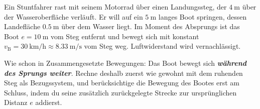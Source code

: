 \documentclass[addpoints,11pt,a4paper]{exam}
\newlength{\antwortraumlen}
\newcommand{\Antwortraum}[1]{%
  \pgfmathsetlength{\antwortraumlen}{#1*2.5cm}%
  \begin{answerbox}
    \rule{0pt}{\antwortraumlen}%
  \end{answerbox}%
}
\begin{document}
\begin{questions}
\begin{taskbox}
\question[10] Ein Stuntfahrer rast mit seinem Motorrad über einen
Landungssteg, der $\SI{4}{\meter}$ über der Wasseroberfläche verläuft. Er
will auf ein $\SI{5}{\meter}$ langes Boot springen, dessen Landefläche
$\SI{0.5}{\meter}$ über dem Wasser liegt. Im Moment des Absprungs ist das
Boot $e=\SI{10}{\meter}$ vom Steg entfernt und bewegt sich mit konstant
$v_{\text{B}}=\SI{30}{\kilo\meter\per\hour}\approx\SI{8.33}{\meter\per\second}$
vom Steg weg. Luftwiderstand wird vernachlässigt.

\begin{hinweisbox}
Wie schon in \glqq Zusammengesetzte Bewegungen\grqq{}: Das Boot bewegt
sich \textbf{\emph{während des Sprungs weiter}}. Rechne deshalb zuerst
wie gewohnt mit dem ruhenden Steg als Bezugssystem, und berücksichtige die
Bewegung des Bootes erst am Schluss, indem du seine zusätzlich
zurückgelegte Strecke zur ursprünglichen Distanz $e$ addierst.
\end{hinweisbox}

\end{taskbox}
\end{questions}
\end{document}
